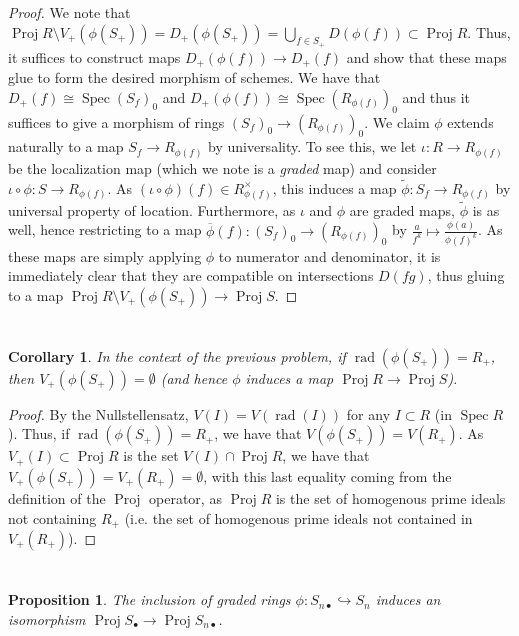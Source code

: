 \documentclass[english,letter,doublesided]{article}
\DeclareMathOperator{\spec}{Spec}
\DeclareMathOperator{\rad}{rad}
\newcommand{\ldt}{\bullet}
\newcommand{\into}{\hookrightarrow}
\newcommand{\prob}[1]{\setcounter{section}{#1-1}\section{}}
\newtheorem*{prop*}{Proposition}
\newtheorem*{cor*}{Corollary}
\theoremstyle{remark}
\theoremstyle{definition}
\renewcommand{\bar}{\overline}
\DeclareMathOperator{\proj}{Proj}
\begin{document}
\begin{proof}
	We note that $\proj R\setminus V_+(\phi(S_+))=D_+(\phi(S_+))=\bigcup_{f\in S_+} D(\phi(f))\subset \proj R$. Thus, it suffices to construct maps $D_+(\phi(f))\to D_+(f)$ and show that these maps glue to form the desired morphism of schemes. We have that $D_+(f)\cong \spec (S_f)_0$ and $D_+(\phi(f))\cong \spec (R_{\phi(f)})_0$ and thus it suffices to give a morphism of rings $(S_f)_0\to (R_{\phi(f)})_0$. We claim $\phi$ extends naturally to a map $S_f\to R_{\phi(f)}$ by universality. To see this, we let $\iota: R\to R_{\phi(f)}$ be the localization map (which we note is a \emph{graded} map) and consider $\iota\circ \phi: S\to R_{\phi(f)}$. As $(\iota\circ \phi)(f)\in R_{\phi(f)}^\times$, this induces a map $\tilde\phi:S_f\to R_{\phi(f)}$ by universal property of location. Furthermore, as $\iota$ and $\phi$ are graded maps, $\tilde\phi$ is as well, hence restricting to a map $\bar\phi(f):(S_f)_0\to (R_{\phi(f)})_0$ by $\frac{a}{f^k}\mapsto \frac{\phi(a)}{\phi(f)^k}$. As these maps are simply applying $\phi$ to numerator and denominator, it is immediately clear that they are compatible on intersections $D(fg)$, thus gluing to a map $\proj R\setminus V_+(\phi(S_+))\to \proj S$. 
\end{proof}
\prob{6}
\begin{cor*}
	In the context of the previous problem, if $\rad(\phi(S_+))=R_+$, then $V_+(\phi(S_+))=\emptyset$ (and hence $\phi$ induces a map $\proj R\to \proj S$).
\end{cor*}
\begin{proof}
By the Nullstellensatz, $V(I)=V(\rad (I))$ for any $I\subset R$ (in $\spec R$). Thus, if $\rad(\phi(S_+))=R_+$, we have that $V(\phi(S_+))=V(R_+)$. As $V_+(I)\subset \proj R$ is the set $V(I)\cap \proj R$, we have that $V_+(\phi(S_+))=V_+(R_+)=\emptyset$, with this last equality coming from the definition of the $\proj$ operator, as $\proj R$ is the set of homogenous prime ideals not containing $R_+$ (i.e. the set of homogenous prime ideals not contained in $V_+(R_+)$).
\end{proof}
\prob{7}\begin{prop*}
 The inclusion of graded rings $\phi:S_{n\ldt}\into S_n$ induces an isomorphism $\proj S_\ldt\to \proj S_{n\ldt}$. 
\end{prop*}
\end{document}
